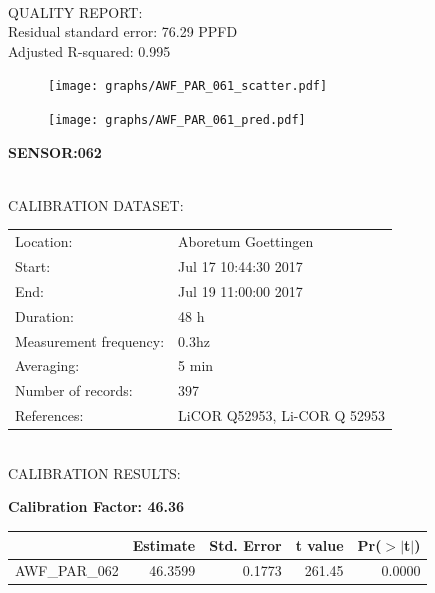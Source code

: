 \documentclass[oneside]{report}
\begin{document}
\hrulefill\\
QUALITY REPORT:\\
Residual standard error: 76.29 PPFD\\
Adjusted R-squared: 0.995



\begin{figure}[H]
  \centering
  \texttt{[image: graphs/AWF\_PAR\_061\_scatter.pdf]}
\end{figure}




\begin{figure}[H]
  \centering
  \texttt{[image: graphs/AWF\_PAR\_061\_pred.pdf]}
\end{figure}

\pagebreak


\begin{center}
\large{\textbf{SENSOR:062}}\\
\end{center}

\hrulefill\\
CALIBRATION DATASET:\\
\begin{table}[h!]
  \centering
  \label{tab:table1}
  \begin{tabular}{ll}
    Location: & Aboretum Goettingen\\ 
    
    
    Start:  & Jul 17 10:44:30 2017 \\
    End:   & Jul 19 11:00:00 2017\\ 
    Duration: & 48 h\\
    Measurement frequency: & 0.3hz\\
    Averaging:  &5 min\\
    Number of records: & 397 \\
    References: & LiCOR Q52953, Li-COR Q 52953 \\
  \end{tabular}
\end{table}

\hrulefill\\
CALIBRATION RESULTS:\\


\begin{center}
\textbf{\large{Calibration Factor: 46.36}}\\
\end{center}
\begin{table}[ht]
\centering
\begin{tabular}{rrrrr}
  \hline
 & Estimate & Std. Error & t value & Pr($>$$|$t$|$) \\ 
  \hline
AWF\_PAR\_062 & 46.3599 & 0.1773 & 261.45 & 0.0000 \\ 
   \hline
\end{tabular}
\end{table}
\end{document}
